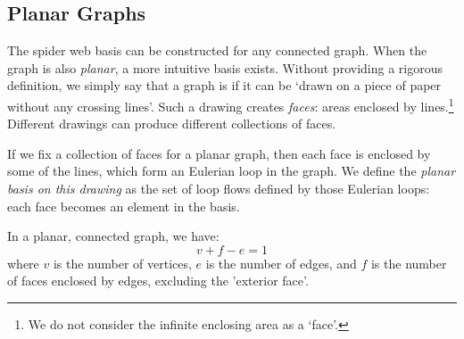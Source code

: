 \documentclass[main.tex]{subfiles}
\begin{document}

\subsection{Planar Graphs}
The spider web basis can be constructed for any connected graph. When the graph is also \emph{planar}, a more intuitive basis exists. Without providing a rigorous definition, we simply say that a graph is  if it can be `drawn on a piece of paper without any crossing lines'. Such a drawing creates \emph{faces}: areas enclosed by lines.\footnote{We do not consider the infinite enclosing area as a `face'.} Different drawings can produce different collections of faces.

If we fix a collection of faces for a planar graph, then each face is enclosed by some of the lines, which form an Eulerian loop in the graph. We define the \emph{planar basis on this drawing} as the set of loop flows defined by those Eulerian loops: each face becomes an element in the basis.


\begin{corollary}
In a planar, connected graph, we have:
$$v + f - e = 1$$
where $v$ is the number of vertices, $e$ is the number of edges, and $f$ is the number of faces enclosed by edges, excluding the 'exterior face'.
\end{corollary}

\end{document}
